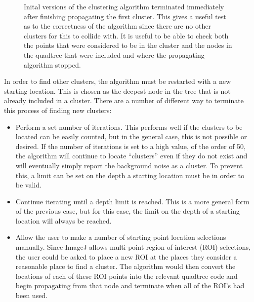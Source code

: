 \begin{figure}[tbhp]
	\caption[Propagation of a single starting location.]{Inital versions of the
		clustering algorithm terminated immediately after finishing propagating
		the first cluster. This gives a useful test as to the correctness of
		the algorithm since there are no other clusters for this to collide
		with. It is useful to be able to check both
		 the points that were considered to
		be in the cluster and  the nodes in
		the quadtree that were included and where the propagating algorithm
		stopped.}\label{fig:single-cluster}
\end{figure}

In order to find other clusters, the algorithm must be restarted with a new
starting location. This is chosen as the deepest node in the tree that is not
already included in a cluster. There are a number of different way to terminate
this process of finding new clusters:

\begin{itemize}

	\item Perform a set number of iterations. This performs well if the
		clusters to be located can be easily counted, but in the general case,
		this is not possible or desired. If the number of iterations is set to
		a high value, of the order of 50, the algorithm will continue to locate
		``clusters'' even if they do not exist and will eventually simply
		report the background noise as a cluster. To prevent this, a limit can
		be set on the depth a starting location must be in order to be valid.

	\item Continue iterating until a depth limit is reached. This is a more
		general form of the previous case, but for this case, the limit on the
		depth of a starting location will always be reached.

	\item Allow the user to make a number of starting point location selections
		manually. Since ImageJ allows multi-point region of interest (ROI)
		selections, the user could be asked to place a new ROI at the places
		they consider a reasonable place to find a cluster. The algorithm would
		then convert the locations of each of these ROI points into the
		relevant quadtree code and begin propagating from that node and
		terminate when all of the ROI's had been used.

\end{itemize}

